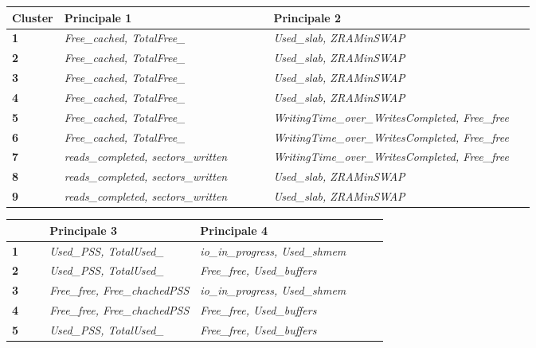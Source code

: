 \begin{figure}
     \begin{tabular}{p{0.1\linewidth} || p{0.4\linewidth} | p{0.55\linewidth}}
     \textbf{Cluster} & \textbf{Principale 1} & \textbf{Principale 2} \\
     \hline
     \hline
     \textbf{1} & \textit{Free\_cached, TotalFree\_} & \textit{Used\_slab, ZRAMinSWAP} \\
     \hline
     \textbf{2} & \textit{Free\_cached, TotalFree\_} & \textit{Used\_slab, ZRAMinSWAP} \\
     \hline
     \textbf{3} & \textit{Free\_cached, TotalFree\_} & \textit{Used\_slab, ZRAMinSWAP} \\
     \hline
     \textbf{4} & \textit{Free\_cached, TotalFree\_} & \textit{Used\_slab, ZRAMinSWAP} \\
     \hline
     \textbf{5} & \textit{Free\_cached, TotalFree\_} & \textit{WritingTime\_over\_WritesCompleted, Free\_free} \\
     \hline
     \textbf{6} & \textit{Free\_cached, TotalFree\_} & \textit{WritingTime\_over\_WritesCompleted, Free\_free} \\
     \hline
     \textbf{7} & \textit{reads\_completed, sectors\_written} &	\textit{WritingTime\_over\_WritesCompleted, Free\_free} \\
     \hline
     \textbf{8} &  \textit{reads\_completed, sectors\_written} & \textit{Used\_slab, ZRAMinSWAP} \\
     \hline
     \textbf{9} &  \textit{reads\_completed, sectors\_written} & \textit{Used\_slab, ZRAMinSWAP} \\
     \hline
   \end{tabular}
  \begin{tabular}{p{0.1\linewidth} || p{0.4\linewidth} | p{0.55\linewidth}}
   & \textbf{Principale 3} & \textbf{Principale 4}  \\
    \hline
    \hline
    \textbf{1} & \textit{Used\_PSS, TotalUsed\_} & \textit{io\_in\_progress, Used\_shmem} \\
    \hline
    \textbf{2} & \textit{Used\_PSS, TotalUsed\_} & \textit{Free\_free, Used\_buffers} \\
    \hline
    \textbf{3} & \textit{Free\_free, Free\_chachedPSS} & \textit{io\_in\_progress, Used\_shmem} \\
    \hline
    \textbf{4} & \textit{Free\_free, Free\_chachedPSS} & \textit{Free\_free, Used\_buffers} \\
    \hline
    \textbf{5} & \textit{Used\_PSS, TotalUsed\_}  & \textit{Free\_free, Used\_buffers} \\

\end{tabular}
\end{figure}
